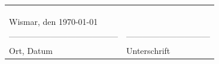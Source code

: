 \documentclass[12pt,					%
							 oneside,			%
							 a4paper,			%
							 halfparskip,		%
							 liststotoc,			%
							 bibtotoc,			%
							 fleqn,				%
							 pointlessnumbers]	%
							 {scrreprt}
\begin{document}
	\begin{tabular}{p{10cm}p{13cm}}
		\\
  		\\
  		\\
  		\\
  		Wismar, den \today \\
  		---------------------------------------  & ------------------------------ \\
  		Ort, Datum & Unterschrift
	\end{tabular}
	
\end{document}
